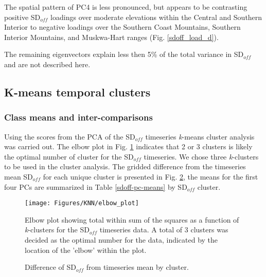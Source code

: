 \documentclass{tATO2e}
\newcommand{\sdoff}{SD$_{off}$}
\begin{document}
 \par
 The spatial pattern of PC4 is less pronounced, but appears to be contrasting positive \sdoff{} loadings over moderate elevations within the Central and Southern Interior to negative loadings over the Southern Coast Mountains, Southern Interior Mountains, and Muskwa-Hart ranges (Fig. \ref{sdoff_load_d}). 
 \par
 The remaining eigenvectors explain less then 5\% of the total variance in \sdoff{} and are not described here.

\subsection{K-means temporal clusters}
\subsubsection{Class means and inter-comparisons}
Using the scores from the PCA of the \sdoff{} timeseries \textit{k}-means cluster analysis was carried out. The elbow plot in Fig. \ref{elbowplot} indicates that 2 or 3 clusters is likely the optimal number of cluster for the \sdoff{} timeseries. We chose three \textit{k}-clusters to be used in the cluster analysis. The gridded difference from the timeseries mean \sdoff{} for each unique cluster is presented in Fig. \ref{clust_means}, the means for the first four PCs are summarized in Table \ref{sdoff-pc-means} by \sdoff{} cluster.


\begin{figure}
	\begin{center}
		\texttt{[image: Figures/KNN/elbow\_plot]}
		\caption{Elbow plot showing total within sum of the squares as a function of \textit{k}-clusters for the \sdoff{} timeseries data. A total of 3 clusters was decided as the optimal number for the data, indicated by the location of the 'elbow' within the plot.}
		\label{elbowplot}
	\end{center}
\end{figure}



\begin{figure}[!h]
	\begin{center}
		\hspace{5pt}
		\hspace{5pt}
		\hspace{5pt}
		\hspace{5pt}
		\caption{Difference of \sdoff{} from timeseries mean by cluster.}
		\label{clust_means}
	\end{center}
\end{figure}
\end{document}
